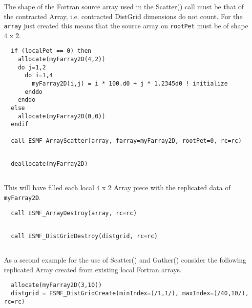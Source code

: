    The shape of the Fortran source array used in the Scatter() call must be
   that of the contracted Array, i.e. contracted DistGrid dimensions do not
   count. For the {\tt array} just created this means that the source array
   on {\tt rootPet} must be of shape 4 x 2. 

 \begin{verbatim}
  if (localPet == 0) then
    allocate(myFarray2D(4,2))
    do j=1,2
      do i=1,4
        myFarray2D(i,j) = i * 100.d0 + j * 1.2345d0 ! initialize
      enddo
    enddo
  else
    allocate(myFarray2D(0,0))
  endif
  
  call ESMF_ArrayScatter(array, farray=myFarray2D, rootPet=0, rc=rc)
 
\end{verbatim}
 

 \begin{verbatim}
  deallocate(myFarray2D)
 
\end{verbatim}
 

   This will have filled each local 4 x 2 Array piece with the replicated
   data of {\tt myFarray2D}. 

 \begin{verbatim}
  call ESMF_ArrayDestroy(array, rc=rc)
 
\end{verbatim}
 

 \begin{verbatim}
  call ESMF_DistGridDestroy(distgrid, rc=rc)
 
\end{verbatim}
 

   As a second example for the use of Scatter() and Gather() consider the
   following replicated Array created from existing local Fortran arrays. 

 \begin{verbatim}
  allocate(myFarray2D(3,10))
  distgrid = ESMF_DistGridCreate(minIndex=(/1,1/), maxIndex=(/40,10/), rc=rc)
 
\end{verbatim}
 
